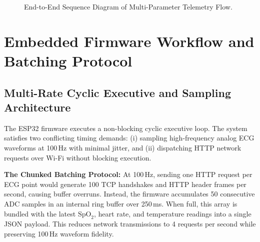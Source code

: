 \documentclass[12pt]{article}
\begin{document}
\begin{figure}[htbp]
\begin{tcolorbox}[tikzbox, title={End-to-End Telemetry Data Flow Sequence Diagram}, width=\linewidth]
{%
}
\end{tcolorbox}
\vspace{-0.2cm}
\caption{End-to-End Sequence Diagram of Multi-Parameter Telemetry Flow.}
\label{fig:e2e_sequence}
\end{figure}
\clearpage

\section{Embedded Firmware Workflow and Batching Protocol}
\label{sec:firmware_workflow}

\subsection{Multi-Rate Cyclic Executive and Sampling Architecture}
The ESP32 firmware executes a non-blocking cyclic executive loop. The system satisfies two conflicting timing demands: (i) sampling high-frequency analog ECG waveforms at 100\,Hz with minimal jitter, and (ii) dispatching HTTP network requests over Wi-Fi without blocking execution.

\textbf{The Chunked Batching Protocol:} At 100\,Hz, sending one HTTP request per ECG point would generate 100 TCP handshakes and HTTP header frames per second, causing buffer overruns. Instead, the firmware accumulates 50 consecutive ADC samples in an internal ring buffer over 250\,ms. When full, this array is bundled with the latest $\text{SpO}_2$, heart rate, and temperature readings into a single JSON payload. This reduces network transmissions to 4 requests per second while preserving 100\,Hz waveform fidelity.
\end{document}

